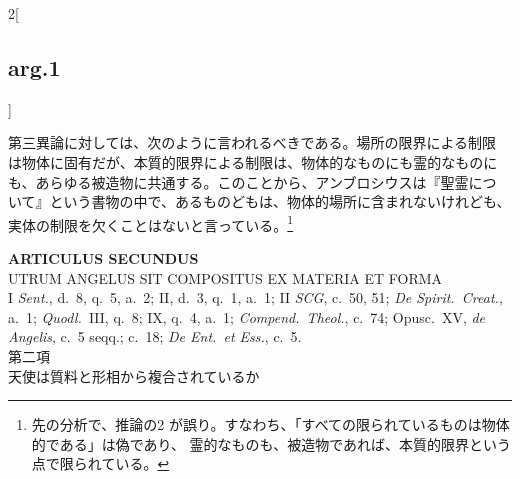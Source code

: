 \documentclass[paper=a4paper,fontsize=10pt,jafontsize=9pt,titlepage]{jlreq}
\begin{document}
\begin{paracol}{2}[\subsection{arg.1}]
\switchcolumn

第三異論に対しては、次のように言われるべきである。場所の限界による制限
は物体に固有だが、本質的限界による制限は、物体的なものにも霊的なものに
も、あらゆる被造物に共通する。このことから、アンブロシウスは『聖霊につ
いて』という書物の中で、あるものどもは、物体的場所に含まれないけれども、
実体の制限を欠くことはないと言っている。\footnote{先の分析で、推論の2
が誤り。すなわち、「すべての限られているものは物体的である」は偽であり、
霊的なものも、被造物であれば、本質的限界という点で限られている。}

\end{paracol}
\newpage

{}
\setcounter{section}{2}
\setcounter{subsection}{0}
\begin{center}
 {\Large {\bfseries ARTICULUS SECUNDUS}}\\
 {\large UTRUM ANGELUS SIT COMPOSITUS EX MATERIA ET FORMA}\\
 {\footnotesize I {\itshape Sent.}, d.~8, q.~5, a.~2; II, d.~3, q.~1,
 a.~1; II {\itshape SCG}, c.~50, 51; {\itshape De Spirit.~Creat.}, a.~1;
 {\itshape Quodl.}~III, q.~8; IX, q.~4, a.~1; {\itshape
 Compend.~Theol.}, c.~74; Opusc.~XV, {\itshape de Angelis}, c.~5 seqq.;
 c.~18; {\itshape De Ent.~et Ess.}, c.~5.}\\
 {\Large 第二項\\天使は質料と形相から複合されているか}
\end{center}
\end{document}
